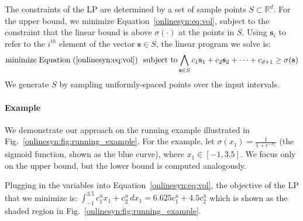 

The constraints of the LP are
determined by a set of sample points $ S \subset \mathbb{R}^d $. For the upper
bound, we
minimize Equation~\ref{onlinesyn:eq:vol}, subject to the constraint that the
linear bound
is above $ \sigma(\cdot) $ at the points in $ S $. Using $ \mathbf{s}_i $ to
refer to the $ i^{th} $ element of the vector $ \mathbf{s} \in S $, the linear
program we solve is:
\begin{equation}\label{onlinesyn:eq:lp}
\begin{gathered}
	\text{minimize}\;\text{Equation}\;(\ref{onlinesyn:eq:vol}) ~~
	\text{subject to} \bigwedge_{\mathbf{s} \in S} c_1\mathbf{s}_1 +
	c_2\mathbf{s}_2  + \dots + c_{d+1} \geq \sigma(\mathbf{s})
\end{gathered}
\end{equation}
We generate $ S $ by sampling uniformly-spaced points over the input intervals.


\paragraph{Example}

We demonstrate our approach on the running example illustrated in
Fig.~\ref{onlinesyn:fig:running_example}. For the example, let
$ \sigma(x_1) = \frac{1}{1 + e^{-x_1}} $ (the sigmoid function, shown as the
blue curve), where $ x_1 \in [-1, 3.5] $. We focus only on the upper bound, but
the lower bound is computed analogously.


Plugging in the variables into
Equation~\ref{onlinesyn:eq:vol}, the objective of the LP that we minimize is:
$
\displaystyle\int_{-1}^{3.5} c_1^ux_1 + c_2^u \,dx_1 = 6.625c_1^u + 4.5c_2^u
$
which is shown as the shaded region in Fig.~\ref{onlinesyn:fig:running_example}.

